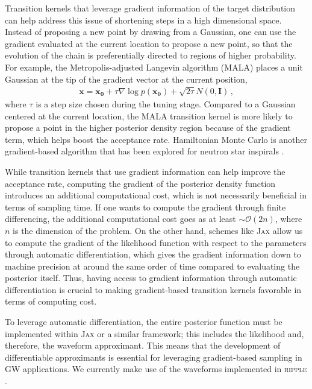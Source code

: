 \documentclass[twocolumn]{aastex631}
\begin{document}
Transition kernels that leverage gradient information of the target
distribution can help address this issue of shortening steps in a high
dimensional space. Instead of proposing a new point by drawing from a Gaussian,
one can use the gradient evaluated at the current location to propose a new
point, so that the evolution of the chain is preferentially directed to regions
of higher probability. For example, the Metropolis-adjusted Langevin algorithm
(MALA) \citep{10.2307/2346184} places a unit Gaussian at the tip of the gradient
vector at the current position,
\begin{align}
    \mathbf{x} = \mathbf{x_0} + \tau \nabla\log{p(\mathbf{x_0})} + \sqrt{2\tau}N(0,\mathbf{I})\, ,
\end{align}
where $\tau$ is a step size chosen during the tuning stage. Compared to a
Gaussian centered at the current location, the MALA transition kernel is more
likely to propose a point in the higher posterior density region because of the
gradient term, which helps boost the acceptance rate.
Hamiltonian Monte Carlo \citep{2017arXiv170102434B} is another gradient-based
algorithm that has been explored for neutron star inspirals
\citep{Bouffanais:2018hoz}.

While transition kernels that use gradient information can help improve the
acceptance rate, computing the gradient of the posterior density function
introduces an additional computational cost, which is not necessarily
beneficial in terms of sampling time. If one wants to compute the gradient
through finite differencing, the additional computational cost goes as at least
${\sim} \mathcal{O}(2n)$, where $n$ is the dimension of the problem. On the
other hand, schemes like \textsc{Jax}
\citep{jax2018github} allow us to compute the gradient of the likelihood
function with respect to the parameters through automatic differentiation,
which gives the gradient information down to machine precision at around the
same order of time compared to evaluating the posterior itself. Thus, having
access to gradient information through automatic differentiation is crucial to
making gradient-based transition kernels favorable in terms of computing cost.

To leverage automatic differentiation, the entire posterior function must be
implemented within \textsc{Jax} or a similar framework; this includes the
likelihood and, therefore, the waveform approximant.  This means that the
development of differentiable approximants is essential for leveraging
gradient-based sampling in GW applications. We currently make use of the
waveforms implemented in \textsc{ripple} \citep{Edwards:2023sak}.
\end{document}

